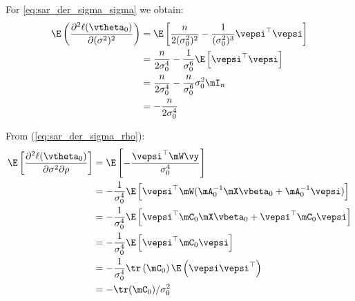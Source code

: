 \documentclass[english,12pt]{book}\usepackage[]{graphicx}\usepackage[]{xcolor}
\begin{document}
\begin{subappendices}
For \eqref{eq:sar_der_sigma_sigma} we obtain:
\begin{equation}\label{eq:E_der_sigma_sigma}
  \begin{aligned}
\E\left(\frac{\partial^2 \ell(\vtheta_0)}{\partial (\sigma^2)^2}\right) & = \E\left[\frac{n}{2(\sigma^2_0) ^2} - \frac{1}{(\sigma^2_0)^3} \vepsi^\top \vepsi\right] \\
& = \frac{n}{2\sigma^4_0} - \frac{1}{\sigma^6_0}\E\left[\vepsi^\top \vepsi\right] \\
& = \frac{n}{2\sigma^4_0} - \frac{n}{\sigma^6_0} \sigma^2_0 \mI_n \\
& = - \frac{n}{2\sigma^4_0} 
  \end{aligned}
\end{equation}

From (\ref{eq:sar_der_sigma_rho}):
\begin{equation}\label{eq:E_der_sigma_rho}
	\begin{aligned}
	\E\left[\frac{\partial^2 \ell(\vtheta_0)}{\partial \sigma^2 \partial \rho}\right] &= \E\left[-\frac{\vepsi^\top\mW\vy}{\sigma^4_0}\right] \\
	& = - \frac{1}{\sigma^4_0}\E\left[\vepsi^\top\mW(\mA^{-1}_0\mX\vbeta_0 + \mA^{-1}_0\vepsi)\right] \\
	& = - \frac{1}{\sigma^4_0}\E\left[\vepsi^\top\mC_0\mX\vbeta_0 + \vepsi^\top\mC_0\vepsi\right] \\
	& = - \frac{1}{\sigma^4_0}\E\left[\vepsi^\top\mC_0\vepsi\right] \\
	& = - \frac{1}{\sigma^4_0}\tr\left(\mC_0\right) \E\left(\vepsi\vepsi^\top\right) \\
	& = - \tr(\mC_0)/\sigma^2_0
	\end{aligned}
\end{equation}


\end{subappendices}
\end{document}
